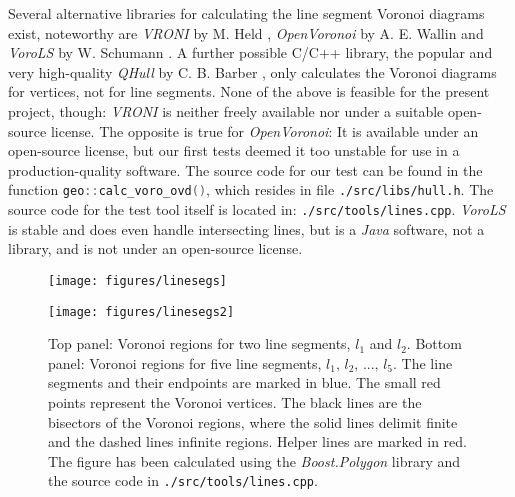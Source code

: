 Several alternative libraries for calculating the line segment Voronoi diagrams exist,
noteworthy are \textit{VRONI} by M. Held \cite{Held2001}, \textit{OpenVoronoi} by A. E. Wallin \cite{web_openvoronoi}
and \textit{VoroLS} by W. Schumann \cite{DiplomaSchumann}.
A further possible C/C++ library, the popular and very high-quality \textit{QHull} by 
C. B. Barber \cite{web_qhull}, only calculates the Voronoi diagrams for vertices, not for line segments.
None of the above is feasible for the present project, though: \textit{VRONI} is neither freely available 
nor under a suitable open-source license.
The opposite is true for \textit{OpenVoronoi}: It is available under an open-source license, but our first tests
deemed it too unstable for use in a production-quality software. The source code for our test can be found in
the function \lstinline[language=C++]|geo::calc_voro_ovd()|, which resides in file \lstinline|./src/libs/hull.h|.
The source code for the test tool itself is located in: \lstinline|./src/tools/lines.cpp|.
\textit{VoroLS} is stable and does even handle intersecting lines, but is a \textit{Java}
software, not a library, and is not under an open-source license.


\begin{figure}
	\begin{minipage}{1 \textwidth}
		\begin{center}
			\texttt{[image: figures/linesegs]}
		\end{center}
		\vspace{0.25cm}
	\end{minipage}
	\begin{minipage}{1 \textwidth}
		\vspace{0.25cm}
		\begin{center}
			\texttt{[image: figures/linesegs2]}
		\end{center}
	\end{minipage}
	\caption[Voronoi diagrams for line segments.]{
		Top panel: Voronoi regions for two line segments, $l_1$ and $l_2$.
		Bottom panel: Voronoi regions for five line segments, $l_1,\, l_2,\, ...,\, l_5$.
		The line segments and their endpoints are marked in blue. The small red points represent the Voronoi vertices.
		The black lines are the bisectors of the Voronoi regions, where the solid lines delimit finite and the dashed lines
		infinite regions. Helper lines are marked in red. The figure has been calculated using the \textit{Boost.Polygon} library
		\cite{web_boost_polygon_voronoi} and the source code in \lstinline|./src/tools/lines.cpp|.
		\label{fig:linesegs_voro}}
\end{figure}



